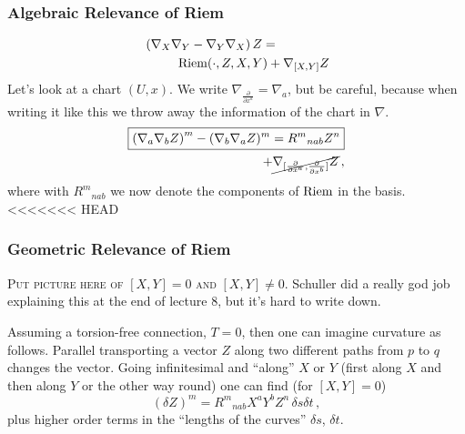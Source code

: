 \documentclass[11pt, a4paper, twocolumn]{article} %
\begin{document}
\subsubsection{Algebraic Relevance of Riem}
\begin{align}
    \nonumber &\left( \nabla_X \nabla_Y - \nabla_Y \nabla_X \right)Z =\\ %
    &\phantom{blabla}\Riem(\cdot, Z,X,Y) + \nabla_{[X,Y]}Z
\end{align}
Let's look at a chart $(U,x)$.
We write $\nabla_{\frac{\partial}{\partial x^a}} = \nabla_a$, but be careful, because when
writing it like this we throw away the information of the chart in $\nabla$.
\begin{align}
    \boxed{\left( \nabla_a\nabla_b Z \right)^m - (\nabla_b\nabla_a Z)^m = R^m{}_{nab}Z^n
    }
    \\\nonumber+ \cancel{\nabla_{[\frac{\partial}{\partial x^a},\frac{\partial}{\partial x^b}]}Z}\,,
\end{align}
where with $R^{m}{}_{nab}$ we now denote the components of $\operatorname{Riem}$ in the basis.
<<<<<<< HEAD

\subsubsection{Geometric Relevance of Riem}
\begin{center}
    \textsc{Put picture here of $[X,Y] = 0$ and
    $[X,Y] \neq 0$}.
    Schuller did a really god job explaining this at the end of lecture
    8, but it's hard to write down.
\end{center}

Assuming a torsion-free connection, $T=0$, then one can imagine curvature as follows.
Parallel transporting a vector $Z$ along two different paths from $p$ to $q$
changes the vector.
Going infinitesimal and ``along'' $X$ or $Y$ (first along $X$ and then along $Y$ or the other
way round) one can find (for $[X,Y] = 0$)
\begin{equation}
    (\delta Z)^m = R^m{}_{nab}X^aY^bZ^n\,\delta s\delta t\,,
\end{equation}
plus higher order terms in the ``lengths of the curves'' $\delta s$, $\delta t$.
\end{document}
